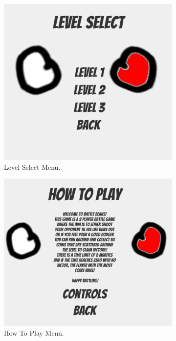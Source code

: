\begin{figure}[h]
\centering
\begin{subfigure}{.5\textwidth}
\centering
  \includegraphics[width= 0.8\linewidth]{Images/LevelSelect.PNG}
  \caption{Level Select Menu.}
  \label{fig:LevelSelectMenu}
  \end{subfigure}%
  \begin{subfigure}{.5\textwidth}
\centering
  \includegraphics[width= 0.8\linewidth]{Images/How To Play.PNG}
  \caption{How To Play Menu.}
  \label{fig:HTP}
  \end{subfigure}%
  \newline
    \begin{subfigure}{.5\textwidth}
\centering

\end{subfigure}
\end{figure}
